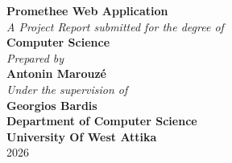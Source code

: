 \documentclass[12pt,a4paper,oneside]{report}
\newcommand{\ProjectTitle}{Promethee Web Application}
\newcommand{\DegreeProgram}{Computer Science}
\newcommand{\StudentName}{Antonin Marouzé}
\newcommand{\SupervisorName}{Georgios Bardis}
\newcommand{\InstitutionName}{University Of West Attika}
\newcommand{\DepartmentName}{Department of Computer Science}
\newcommand{\SubmissionYear}{2026}
\begin{document}


\begin{titlepage}
    \begin{center}
        \vspace*{2cm}
        
        {\Huge \bfseries \textcolor{tablehead}{\ProjectTitle}}\\[1.5cm]
        
        {\large \textit{A Project Report submitted for the degree of}}\\[0.5cm]
        {\Large \bfseries \DegreeProgram}\\[2cm]
        
        {\large \textit{Prepared by}}\\[0.5cm]
        {\Large \bfseries \StudentName}\\[2cm]
        
        {\large \textit{Under the supervision of}}\\[0.5cm]
        {\Large \bfseries \SupervisorName}\\[2.5cm]
        
        {\Large \bfseries \DepartmentName}\\[0.5cm]
        {\Large \bfseries \InstitutionName}\\[1cm]
        {\large \SubmissionYear}
        
    \end{center}
\end{titlepage}

\cleardoublepage
\tableofcontents
\cleardoublepage
{}
{}
\listoffigures

\cleardoublepage
{}
\setcounter{page}{1}

\renewcommand{\thechapter}{\arabic{chapter}}
\renewcommand{\thesection}{\arabic{chapter}.\arabic{section}}

\end{document}

